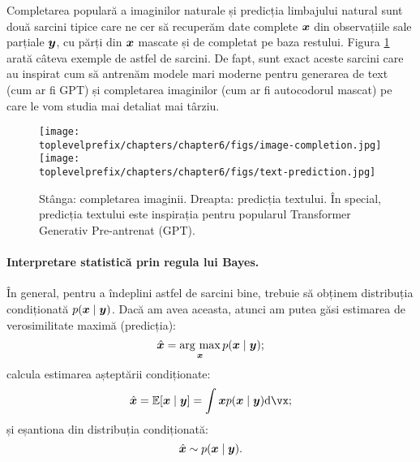 \documentclass[../../book-main_ro.tex]{subfiles}
\begin{document}
\begin{example}
Completarea populară a imaginilor naturale și predicția limbajului natural sunt două sarcini tipice care ne cer să recuperăm date complete $\bm{x}$ din observațiile sale parțiale $\bm{y}$, cu părți din $\bm{x}$ mascate și de completat pe baza restului. Figura \ref{fig:image-text-completion} arată câteva exemple de astfel de sarcini. De fapt, sunt exact aceste sarcini care au inspirat cum să antrenăm modele mari moderne pentru generarea de text (cum ar fi GPT) și completarea imaginilor (cum ar fi autocodorul mascat) pe care le vom studia mai detaliat mai târziu.
    \begin{figure}
        \centering
        \texttt{[image: \\toplevelprefix/chapters/chapter6/figs/image-completion.jpg]} \hspace{10mm} \texttt{[image: \\toplevelprefix/chapters/chapter6/figs/text-prediction.jpg]}
        \caption{Stânga: completarea imaginii. Dreapta: predicția textului. În special, predicția textului este inspirația pentru popularul Transformer Generativ Pre-antrenat (GPT).}
        \label{fig:image-text-completion}
    \end{figure}
\end{example}


\paragraph{Interpretare statistică prin regula lui Bayes.} În general, pentru a îndeplini astfel de sarcini bine, trebuie să obținem distribuția condiționată $p(\bm{x}\mid \bm{y})$. Dacă am avea aceasta, atunci am putea găsi estimarea de verosimilitate maximă (predicția): 
\begin{equation}
  \hat{\bm{x}} = \operatorname*{arg\ max}_{\bm{x}} p(\bm{x}\mid \bm{y});
\end{equation}
calcula estimarea așteptării condiționate: 
\begin{equation}
  \hat{\x} = \mathbb{E}[\x \mid \y] = \int \x p(\x\mid \y)\odif{\vx};
\end{equation}
și eșantiona din distribuția condiționată:  
\begin{equation}
  \hat{\bm{x}} \sim p(\bm{x} \mid \bm{y}).
\end{equation}
\end{document}
